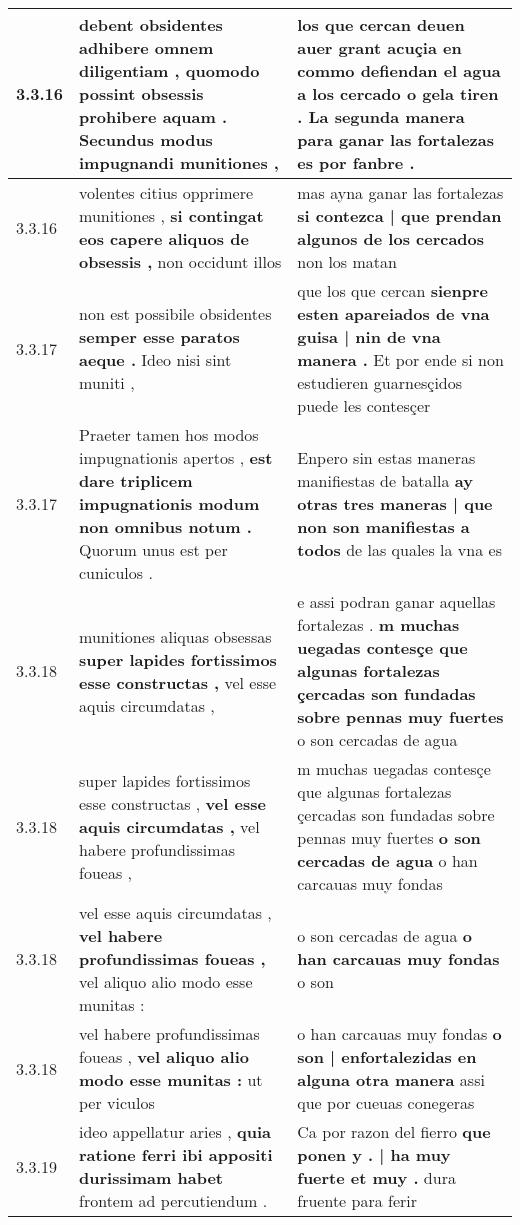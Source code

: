 \begin{tabular}{|p{1cm}|p{6.5cm}|p{6.5cm}|}
3.3.16 & debent obsidentes adhibere omnem diligentiam , \textbf{ quomodo possint obsessis prohibere aquam . } Secundus modus impugnandi munitiones , & los que cercan deuen auer grant acuçia \textbf{ en commo defiendan el agua a los cercado o gela tiren . } La segunda manera para ganar las fortalezas es por fanbre . \\\hline
3.3.16 & volentes citius opprimere munitiones , \textbf{ si contingat eos capere aliquos de obsessis , } non occidunt illos & mas ayna ganar las fortalezas \textbf{ si contezca | que prendan algunos de los cercados } non los matan \\\hline
3.3.17 & non est possibile obsidentes \textbf{ semper esse paratos aeque . } Ideo nisi sint muniti , & que los que cercan \textbf{ sienpre esten apareiados de vna guisa | nin de vna manera . } Et por ende si non estudieren guarnesçidos puede les contesçer \\\hline
3.3.17 & Praeter tamen hos modos impugnationis apertos , \textbf{ est dare triplicem impugnationis modum non omnibus notum . } Quorum unus est per cuniculos . & Enpero sin estas maneras manifiestas de batalla \textbf{ ay otras tres maneras | que non son manifiestas a todos } de las quales la vna es \\\hline
3.3.18 & munitiones aliquas obsessas \textbf{ super lapides fortissimos esse constructas , } vel esse aquis circumdatas , & e assi podran ganar aquellas fortalezas . \textbf{ m muchas uegadas contesçe que algunas fortalezas çercadas son fundadas sobre pennas muy fuertes } o son cercadas de agua \\\hline
3.3.18 & super lapides fortissimos esse constructas , \textbf{ vel esse aquis circumdatas , } vel habere profundissimas foueas , & m muchas uegadas contesçe que algunas fortalezas çercadas son fundadas sobre pennas muy fuertes \textbf{ o son cercadas de agua } o han carcauas muy fondas \\\hline
3.3.18 & vel esse aquis circumdatas , \textbf{ vel habere profundissimas foueas , } vel aliquo alio modo esse munitas : & o son cercadas de agua \textbf{ o han carcauas muy fondas } o son \\\hline
3.3.18 & vel habere profundissimas foueas , \textbf{ vel aliquo alio modo esse munitas : } ut per viculos & o han carcauas muy fondas \textbf{ o son | enfortalezidas en alguna otra manera } assi que por cueuas conegeras \\\hline
3.3.19 & ideo appellatur aries , \textbf{ quia ratione ferri ibi appositi durissimam habet } frontem ad percutiendum . & Ca por razon del fierro \textbf{ que ponen y . | ha muy fuerte et muy . } dura fruente para ferir \\\hline

\end{tabular}

